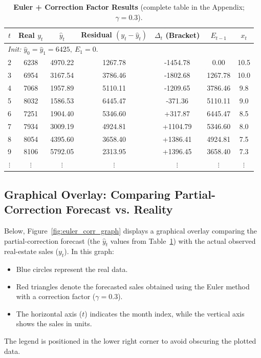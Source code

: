 \documentclass[10pt]{article}
\begin{document}
\begin{table}[H]
\centering
\begin{tabular}{ccccccc}
\toprule
\(t\) & Real \(y_t\) & \(\hat{y}_t\) & Residual \((y_t-\hat{y}_t)\) & \(\Delta_t\) {\footnotesize (Bracket)} & \(E_{t-1}\) & \(x_t\)\\
\midrule
\multicolumn{7}{l}{\textit{Init: } \(\hat{y}_0=\hat{y}_1=6425,\ E_1=0.\)}\\
2 & 6238 & 4970.22 & 1267.78 & -1454.78 & 0.00  & 10.5\\
3 & 6954 & 3167.54 & 3786.46 & -1802.68 & 1267.78 & 10.0\\
4 & 7068 & 1957.89 & 5110.11 & -1209.65 & 3786.46 & 9.8\\
5 & 8032 & 1586.53 & 6445.47 & -371.36  & 5110.11 & 9.0\\
6 & 7251 & 1904.40 & 5346.60 & +317.87  & 6445.47 & 8.5\\
7 & 7934 & 3009.19 & 4924.81 & +1104.79 & 5346.60 & 8.0\\
8 & 8054 & 4395.60 & 3658.40 & +1386.41 & 4924.81 & 7.5\\
9 & 8106 & 5792.05 & 2313.95 & +1396.45 & 3658.40 & 7.3\\
\(\vdots\) & \(\vdots\) & \(\vdots\) & \(\vdots\) & \(\vdots\) & \(\vdots\) & \(\vdots\)\\
\bottomrule
\end{tabular}
\caption{\textbf{Euler + Correction Factor Results} (complete table in the Appendix; \(\gamma=0.3\)).}
\label{tab:euler_corr_24}
\end{table}

\subsection{Graphical Overlay: Comparing Partial-Correction Forecast vs. Reality}

Below, Figure~\ref{fig:euler_corr_graph} displays a graphical overlay comparing the partial-correction forecast (the \(\hat{y}_t\) values from Table~\ref{tab:euler_corr_24}) with the actual observed real-estate sales (\(y_t\)). In this graph:
\begin{itemize}
    \item Blue circles represent the real data.
    \item Red triangles denote the forecasted sales obtained using the Euler method with a correction factor (\(\gamma=0.3\)).
    \item The horizontal axis (\(t\)) indicates the month index, while the vertical axis shows the sales in units.
\end{itemize}
The legend is positioned in the lower right corner to avoid obscuring the plotted data.
\end{document}
